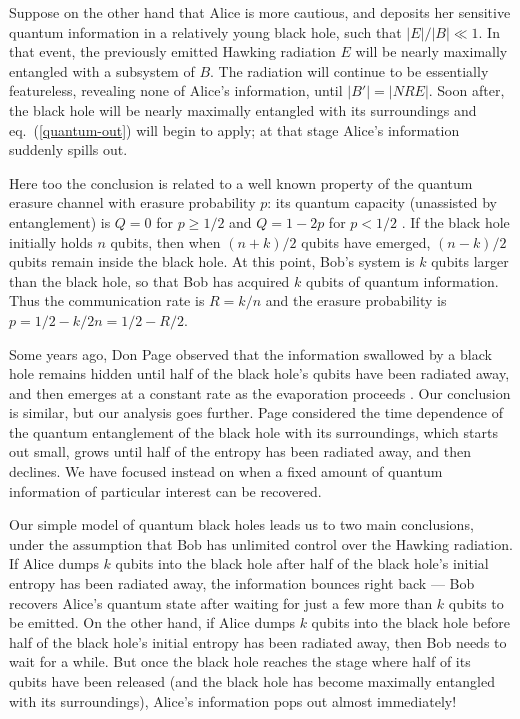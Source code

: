 \documentclass[11pt]{article}
\begin{document}
Suppose on the other hand that Alice is more cautious, and deposits her sensitive quantum information in a relatively young black hole, such that $|E|/|B| \ll 1$. In that event, the previously emitted Hawking radiation $E$ will be nearly maximally entangled with a subsystem of $B$. The radiation will continue to be essentially featureless, revealing none of Alice's information, until $|B'|=|NRE|$. Soon after, the black hole will be nearly maximally entangled with its surroundings and eq.~(\ref{quantum-out}) will begin to apply; at that stage Alice's information suddenly spills out. 

Here too the conclusion is related to a well known property of the quantum erasure channel with erasure probability $p$: its quantum capacity (unassisted by entanglement) is $Q=0$ for $p\ge 1/2$ and $Q=1-2p$ for $p < 1/2$ \cite{quantum-erasure}. If the black hole initially holds $n$ qubits, then when $(n+k)/2$ qubits have emerged, $(n-k)/2$ qubits remain inside the black hole. At this point, Bob's system is $k$ qubits larger than the black hole, so that Bob has acquired $k$ qubits of quantum information.  Thus the communication rate is $R=k/n$ and the erasure probability is $p= 1/2 -k/2n=1/2 - R/2$.

Some years ago, Don Page observed that the information swallowed by a black hole remains hidden until half of the black hole's qubits have been radiated away, and then emerges at a constant rate as the evaporation proceeds \cite{page-entropy}. Our conclusion is similar, but our analysis goes further. Page considered the time dependence of the quantum entanglement of the black hole with its surroundings, which starts out small, grows until half of the entropy has been radiated away, and then declines. We have focused instead on when a fixed amount of quantum information of particular interest can be recovered.

Our simple model of quantum black holes leads us to two main conclusions, under the assumption that Bob has unlimited control over the Hawking radiation. If Alice dumps $k$ qubits into the black hole after half of the black hole's initial entropy has been radiated away, the information bounces right back --- Bob recovers Alice's quantum state after waiting for just a few more than $k$ qubits to be emitted. On the other hand, if Alice dumps $k$ qubits into the black hole before half of the black hole's initial entropy has been radiated away, then Bob needs to wait for a while. But once the black hole reaches the stage where half of its qubits have been released (and the black hole has become maximally entangled with its surroundings), Alice's information pops out almost immediately!
\end{document}
